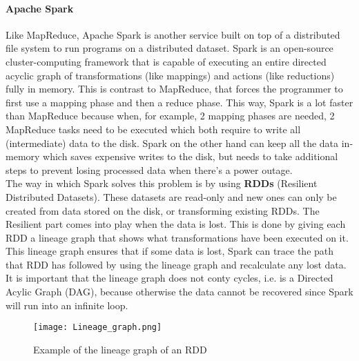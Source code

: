 \paragraph{Apache Spark}
Like MapReduce, Apache Spark is another service built on top of a distributed file system to run programs on a distributed dataset. Spark is an open-source cluster-computing framework that is capable of executing an entire directed acyclic graph of transformations (like mappings) and actions (like reductions) fully in memory\cite{Sparkwebsite}. This is contrast to MapReduce, that forces the programmer to first use a mapping phase and then a reduce phase. This way, Spark is a lot faster than MapReduce because when, for example, 2 mapping phases are needed, 2 MapReduce tasks need to be executed which both require to write all (intermediate) data to the disk. Spark on the other hand can keep all the data in-memory which saves expensive writes to the disk, but needs to take additional steps to prevent losing processed data when there's a power outage.\\

The way in which Spark solves this problem is by using \textbf{RDDs} (Resilient Distributed Datasets). These datasets are read-only and new ones can only be created from data stored on the disk, or transforming existing RDDs\cite{Zaha12}. The Resilient part comes into play when the data is lost. This is done by giving each RDD a lineage graph that shows what transformations have been executed on it. This lineage graph ensures that if some data is lost, Spark can trace the path that RDD has followed by using the lineage graph and recalculate any lost data. It is important that the lineage graph does not conty cycles, i.e. is a Directed Acylic Graph (DAG), because otherwise the data cannot be recovered since Spark will run into an infinite loop.

\begin{figure}
	\begin{center}
		\texttt{[image: Lineage\_graph.png]}
	\end{center}
	\caption{Example of the lineage graph of an RDD\cite{Zaha12}}
	\label{lineagegraph}
\end{figure}
